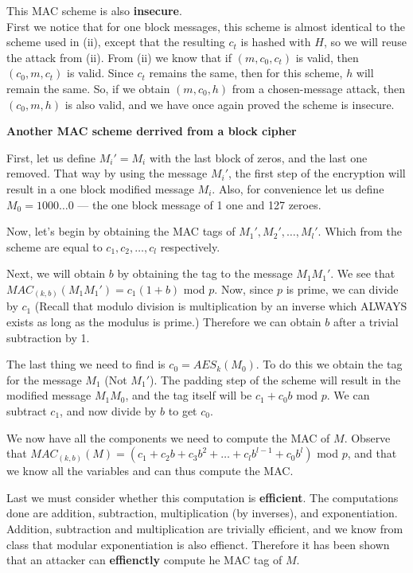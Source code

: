 \documentclass[12pt]{article}
\begin{document}
\begin{list}{.}{}
\begin{list}{)}{}
\item This MAC scheme is also \textbf{insecure}.\\
First we notice that for one block messages, this scheme is almost identical to
the scheme used in (ii), except that the resulting $c_t$ is hashed with $H$, so
we will reuse the attack from (ii).  From (ii) we know that if $(m, c_0, c_t)$
is valid, then $(c_0, m, c_t)$ is valid.  Since $c_t$ remains the same, then for
this scheme, $h$ will remain the same.  So, if we obtain $(m, c_0, h)$ from a
chosen-message attack, then $(c_0, m, h)$ is also valid, and we have once again
proved the scheme is insecure.
\end{list}

\item \textbf{Another MAC scheme derrived from a block cipher}

First, let us define $M_i' = M_i$ with the last block of zeros, and the
last one removed.  That way by using the message $M_i'$, the first step of the
encryption will result in a one block modified message $M_i$.  Also, for
convenience let us define $M_0 = 1000\dots 0$ --- the one block message of 1 one
and 127 zeroes.

Now, let's begin by obtaining the MAC tags of $M_1', M_2', \dots, M_l'$.  Which
from the scheme are equal to $c_1, c_2, \dots, c_l$ respectively.

Next, we will obtain $b$ by obtaining the tag to the message $M_1M_1'$.  We see
that $MAC_{(k,b)}(M_1M_1') = c_1(1 + b)$ mod $p$.  Now, since $p$ is prime, we
can divide by $c_1$ (Recall that modulo division is multiplication by an inverse
which ALWAYS exists as long as the modulus is prime.)  Therefore we can obtain
$b$ after a trivial subtraction by 1.

The last thing we need to find is $c_0 = AES_k(M_0)$.  To do this we obtain the
tag for the message $M_1$ (Not $M_1'$).  The padding step of the scheme will
result in the modified message $M_1M_0$, and the tag itself will be $c_1 + c_0b$
mod $p$.  We can subtract $c_1$, and now divide by $b$ to get $c_0$.

We now have all the components we need to compute the MAC of $M$.  Observe that
$MAC_{(k,b)}(M) = (c_1 + c_2b + c_3b^2 + \dots + c_lb^{l-1} + c_0b^l)$ mod $p$,
and that we know all the variables and can thus compute the MAC.

Last we must consider whether this computation is \textbf{efficient}.  The
computations done are addition, subtraction, multiplication (by inverses), and
exponentiation.  Addition, subtraction and multiplication are trivially
efficient, and we know from class that modular exponentiation is also effienct.
Therefore it has been shown that an attacker can \textbf{effienctly} compute he
MAC tag of $M$.


\end{list}
\end{document}
